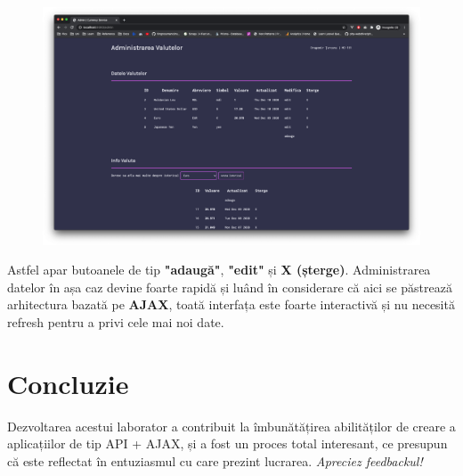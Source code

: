\documentclass[12pt. a4paper]{report}
\begin{document}
\begin{figure}[H]
\centering
	\includegraphics[width=1.0\textwidth]{admin_page}
\end{figure}

Astfel apar butoanele de tip \textbf{"adaugă"}, \textbf{"edit"} și \textbf{X (șterge)}. Administrarea datelor în așa caz devine foarte rapidă și luând în considerare că aici se păstrează arhitectura bazată pe \textbf{AJAX}, toată interfața este foarte interactivă și nu necesită refresh pentru a privi cele mai noi date.


\chapter{Concluzie}
Dezvoltarea acestui laborator a contribuit la îmbunătățirea abilităților de creare a aplicațiilor de tip API + AJAX, și a fost un proces total interesant, ce presupun că este reflectat în entuziasmul cu care prezint lucrarea. \emph{Apreciez feedbackul!}
\end{document}
